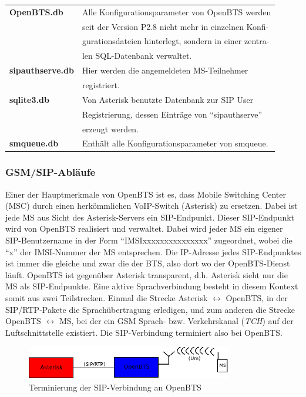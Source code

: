\begin{table}[h]
	\centering
		\begin{tabular}{ll}
			\textbf{OpenBTS.db} & Alle Konfigurationsparameter von OpenBTS werden\\
			& seit der Version P2.8 nicht mehr in einzelnen Konfi-\\
			& gurationsdateien hinterlegt, sondern in einer zentra-\\
			& len SQL-Datenbank verwaltet.\\
			\textbf{sipauthserve.db} & Hier werden die angemeldeten MS-Teilnehmer\\
			& registriert.\\
			\textbf{sqlite3.db} & Von Asterisk benutzte Datenbank zur SIP User\\ 
			& Registrierung, dessen Einträge von "`sipauthserve"'\\
			& erzeugt werden.\\
			 \textbf{smqueue.db} & Enthält alle Konfigurationsparameter von smqueue.\\
		\end{tabular}
\end{table}

\subsubsection{GSM/SIP-Abläufe}
\label{gsmsip} 
Einer der Hauptmerkmale von OpenBTS ist es, dass Mobile Switching Center (MSC) durch einen herkömmlichen VoIP-Switch (Asterisk) zu ersetzen. Dabei ist jede MS aus Sicht des Asterisk-Servers ein SIP-Endpunkt. Dieser SIP-Endpunkt wird von OpenBTS realisiert und verwaltet. Dabei wird jeder MS ein eigener SIP-Benutzername in der Form "`IMSIxxxxxxxxxxxxxxx"' zugeordnet, wobei die "`x"' der IMSI-Nummer der MS entsprechen. Die IP-Adresse jedes SIP-Endpunktes ist immer die gleiche und zwar die der BTS, also dort wo der OpenBTS-Dienst läuft. OpenBTS ist gegenüber Asterisk transparent, d.h. Asterisk sieht nur die MS als SIP-Endpunkte. Eine aktive Sprachverbindung besteht in diesem Kontext somit aus zwei Teilstrecken. Einmal die Strecke Asterisk $ \longleftrightarrow $ OpenBTS, in der SIP/RTP-Pakete die Sprachübertragung erledigen, und zum anderen die Strecke OpenBTS $ \longleftrightarrow $ MS, bei der ein GSM Sprach- bzw. Verkehrskanal (\textit{TCH}) auf der Luftschnittstelle existiert. Die SIP-Verbindung terminiert also bei OpenBTS.
\begin{figure}[h]
	\centering
		\includegraphics[width=0.80\textwidth]{img/openbts_sip_asterisk.png}
	\caption{Terminierung der SIP-Verbindung an OpenBTS}
	\label{fig:openbts_sip_asterisk}
\end{figure}


